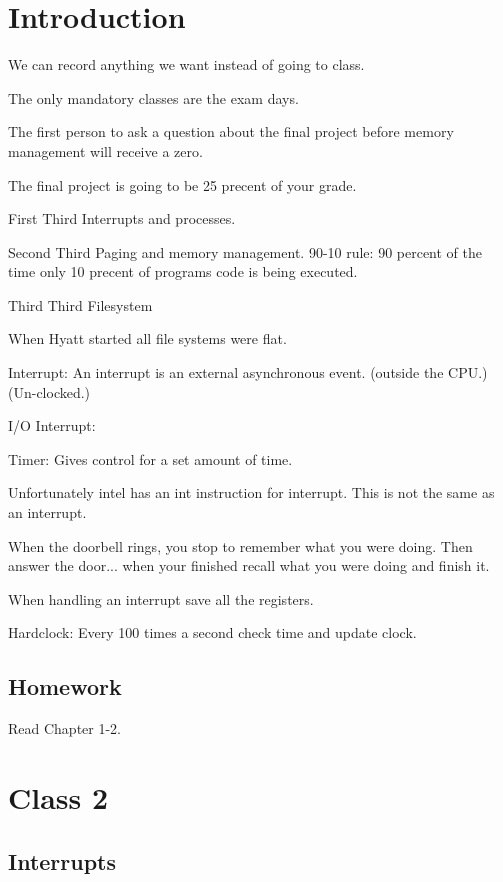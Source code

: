 \documentclass{article}
\begin{document}
\section*{Introduction}

We can record anything we want instead of going to class.

The only mandatory classes are the exam days. 

The first person to ask a question about the final project before memory management will receive a zero.

The final project is going to be 25 precent of your grade. 

First Third
Interrupts and processes.

Second Third
Paging and memory management.
90-10 rule: 90 percent of the time only 10 precent of programs code is being executed.

Third Third
Filesystem

When Hyatt started all file systems were flat. 

Interrupt: An interrupt is an external asynchronous event. (outside the CPU.) (Un-clocked.)

I/O Interrupt: 

Timer: Gives control for a set amount of time. 

Unfortunately intel has an int instruction for interrupt. This is not the same as an interrupt. 

When the doorbell rings, you stop to remember what you were doing. Then answer the door... when your finished recall what you were doing and finish it. 

When handling an interrupt save all the registers.

Hardclock: Every 100 times a second check time and update clock.

\subsection*{Homework}

Read Chapter 1-2.

\section*{Class 2}

\subsection*{Interrupts}
\end{document}
